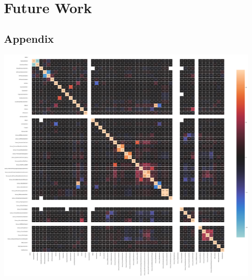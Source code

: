 \documentclass[sigconf]{acmart}
\begin{document}
\section{Future Work}



\subsection{Appendix}

\label{lytle:correlation}
\includegraphics[scale=0.2]{correlation.PNG}

\end{document}
